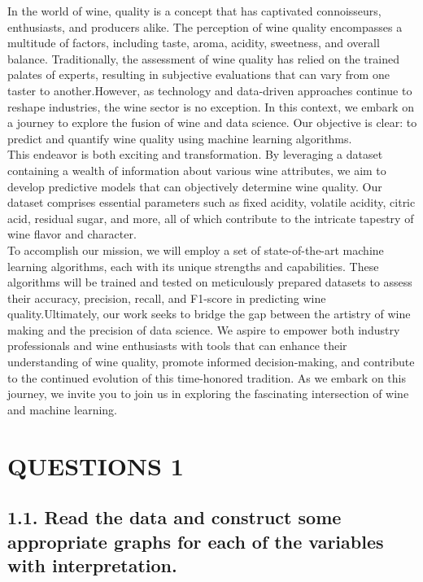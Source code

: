 \documentclass{report}
\begin{document}
In the world of wine, quality is a concept that has captivated connoisseurs, enthusiasts, and producers alike.
The perception of wine quality encompasses a multitude of factors, including taste, aroma, acidity, sweetness, and overall balance. Traditionally, the assessment of wine quality has relied on the trained palates of experts, 
resulting in subjective evaluations that can vary from one taster to another.However, as technology and data-driven approaches continue to reshape industries, the wine sector is no exception.
In this context, we embark on a journey to explore the fusion of wine and data science. Our objective is clear: to predict and quantify wine quality using machine learning algorithms.\\
This endeavor is both exciting and transformation. By leveraging a dataset containing a wealth of information about various wine attributes, we aim to develop predictive models that can objectively determine wine quality. Our dataset comprises essential parameters such as fixed acidity, volatile acidity, citric acid, residual sugar, and more, all of which contribute to the intricate tapestry of wine flavor and character.\vspace*{0.5cm}\\
To accomplish our mission, we will employ a set of state-of-the-art machine learning algorithms, each with its unique strengths and capabilities. These algorithms will be trained and tested on meticulously prepared datasets to assess their accuracy, precision, recall, and F1-score in predicting wine quality.Ultimately, our work seeks to bridge the gap between the artistry of wine making and the precision of data science. We aspire to empower both industry professionals and wine enthusiasts with tools that can enhance their understanding of wine quality, promote informed decision-making, and contribute to the continued evolution of this time-honored tradition. As we embark on this journey, we invite you to join us in exploring the fascinating intersection of wine and machine learning.


\chapter*{\huge{QUESTIONS 1}}

\section*{1.1. Read the data and construct some appropriate graphs for each of the variables with
interpretation.}
\end{document}
